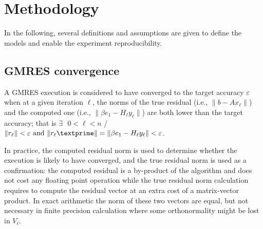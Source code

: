 \section{Methodology}
In the following, several definitions and assumptions are given to define the models and enable the experiment reproducibility.
\subsection{GMRES convergence}
A GMRES execution is considered to have converged to the target accuracy $\varepsilon$ when at a given iteration $\ell$, the norms of the
true residual (i.e., $\|b-Ax_\ell\|$) and the computed one (i.e., $\| \beta e_1 - H_\ell y_\ell\|$) are both lower than the target accuracy;
that is  $\exists \text{ } 0 < \ell < n$ / $\|r_{\ell}\| < \varepsilon \text{ and } \|r_{\ell}\textprime\| = \| \beta e_1 - H_\ell y_\ell\| < \varepsilon$. 

In practice, the computed residual norm is used to determine whether the execution is likely to have converged, and the true residual norm is used as a confirmation: the computed residual is a by-product of the algorithm and does not cost any floating point operation while the true residual norm calculation
requires to compute the residual vector at an extra cost of a matrix-vector product. In exact arithmetic the norm of these two vectors are equal,
but not necessary in finite precision calculation where some orthonormality might be lost in $V_i$.


